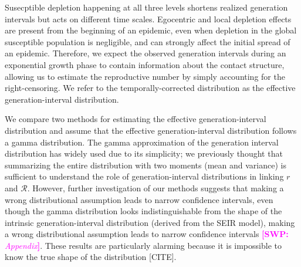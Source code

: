\documentclass[12pt]{article}
\newcommand{\RR}{\ensuremath{{\mathcal R}}}
\newcommand{\comment}[3]{\textcolor{#1}{\textbf{[#2: }\textsl{#3}\textbf{]}}}
\newcommand{\swp}[1]{\comment{magenta}{SWP}{#1}}
\begin{document}
Susecptible depletion happening at all three levels shortens realized generation intervals but acts on different time scales.
Egocentric and local depletion effects are present from the beginning of an epidemic, even when depletion in the global susceptible population is negligible, and can strongly affect the initial spread of an epidemic.
Therefore, we expect the observed generation intervals during an exponential growth phase to contain information about the contact structure, allowing us to estimate the reproductive number by simply accounting for the right-censoring.
We refer to the temporally-corrected distribution as the effective generation-interval distribution.

We compare two methods for estimating the effective generation-interval distribution and assume that the effective generation-interval distribution follows a gamma distribution.
The gamma approximation of the generation interval distribution has widely used due to its simplicity;
we previously thought that summarizing the entire distribution with two moments (mean and variance) is sufficient to understand the role of generation-interval distributions in linking $r$ and $\RR$.
However, further investigation of our methods suggests that making a wrong distributional assumption leads to narrow confidence intervals, even though the gamma distribution looks indistinguishable from the shape of the intrinsic generation-interval distribution (derived from the SEIR model), making a wrong distributional assumption leads to narrow confidence intervals \swp{Appendix}.
These results are particularly alarming because it is impossible to know the true shape of the distribution [CITE].





\end{document}
